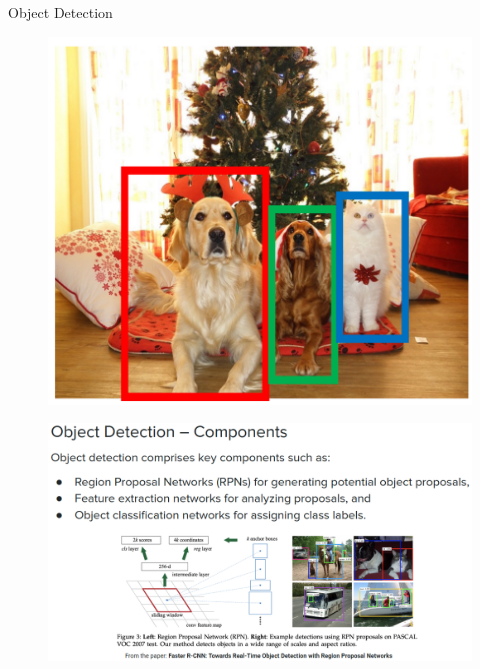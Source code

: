 \begin{frame}[allowframebreaks]{Object Detection}
    \begin{figure}
        \centering
        \includegraphics[width=1.0\textwidth,height=0.95\textheight,keepaspectratio]{images/object-detect/object_1.png}
    \end{figure}

\framebreak

    \begin{figure}
        \centering
        \includegraphics[width=1.02\textwidth,height=0.9\textheight,keepaspectratio]{images/object-detect/intro-2.png}
    \end{figure}

\framebreak


\end{frame}
